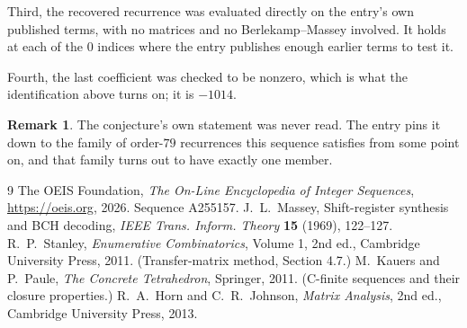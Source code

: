 \documentclass[11pt,a4paper]{article}
\theoremstyle{plain}
\theoremstyle{definition}
\newtheorem{remark}[theorem]{Remark}
\begin{document}
Third, the recovered recurrence was evaluated directly on the entry's own published terms, with
no matrices and no Berlekamp--Massey involved. It holds at each of the $0$ indices where
the entry publishes enough earlier terms to test it.

Fourth, the last coefficient was checked to be nonzero, which is what the identification above
turns on; it is $-1014$.

\begin{remark}
The conjecture's own statement was never read. The entry pins it down to the family of
order-$79$ recurrences this sequence satisfies from some point on, and that family turns
out to have exactly one member.
\end{remark}

\begin{thebibliography}{9}
 The OEIS Foundation, \emph{The On-Line Encyclopedia of Integer
Sequences}, \url{https://oeis.org}, 2026. Sequence A255157.
 J.~L.~Massey, Shift-register synthesis and BCH decoding, \emph{IEEE
Trans. Inform. Theory} \textbf{15} (1969), 122--127.
 R.~P.~Stanley, \emph{Enumerative Combinatorics}, Volume 1, 2nd ed.,
Cambridge University Press, 2011. (Transfer-matrix method, Section 4.7.)
 M.~Kauers and P.~Paule, \emph{The Concrete Tetrahedron}, Springer, 2011.
(C-finite sequences and their closure properties.)
 R.~A.~Horn and C.~R.~Johnson, \emph{Matrix Analysis}, 2nd ed., Cambridge
University Press, 2013.
\end{thebibliography}
\end{document}
